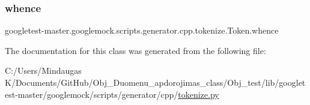 \subsubsection{\texorpdfstring{whence}{whence}}
{\footnotesize\ttfamily googletest-\/master.\+googlemock.\+scripts.\+generator.\+cpp.\+tokenize.\+Token.\+whence}



The documentation for this class was generated from the following file\+:\begin{DoxyCompactItemize}
\item 
C\+:/\+Users/\+Mindaugas K/\+Documents/\+Git\+Hub/\+Obj\+\_\+\+Duomenu\+\_\+apdorojimas\+\_\+class/\+Obj\+\_\+test/lib/googletest-\/master/googlemock/scripts/generator/cpp/\mbox{\hyperlink{_obj__test_2lib_2googletest-master_2googlemock_2scripts_2generator_2cpp_2tokenize_8py}{tokenize.\+py}}\end{DoxyCompactItemize}
